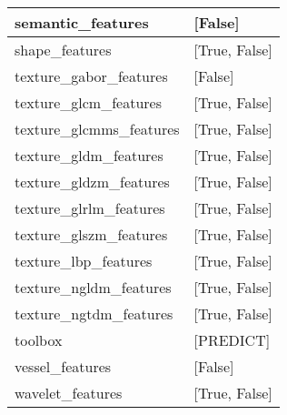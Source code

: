 \begin{table}[]
\begin{tabular}{l|l}
semantic\_features & {[False]} \\ \hline
shape\_features & {[True, False]} \\ \hline
texture\_gabor\_features & {[False]} \\ \hline
texture\_glcm\_features & {[True, False]} \\ \hline
texture\_glcmms\_features & {[True, False]} \\ \hline
texture\_gldm\_features & {[True, False]} \\ \hline
texture\_gldzm\_features & {[True, False]} \\ \hline
texture\_glrlm\_features & {[True, False]} \\ \hline
texture\_glszm\_features & {[True, False]} \\ \hline
texture\_lbp\_features & {[True, False]} \\ \hline
texture\_ngldm\_features & {[True, False]} \\ \hline
texture\_ngtdm\_features & {[True, False]} \\ \hline
toolbox & {[PREDICT]} \\ \hline
vessel\_features & {[False]} \\ \hline
wavelet\_features & {[True, False]} \\ \hline

\end{tabular}
\end{table}
